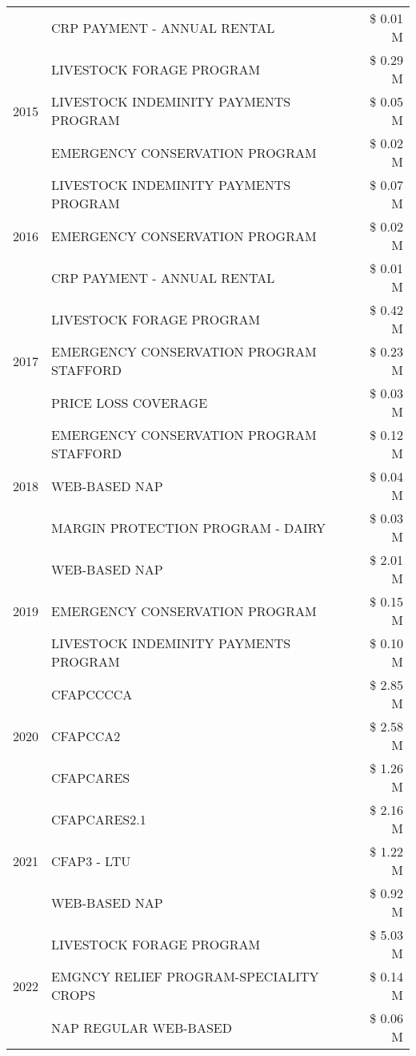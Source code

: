 \begin{tabular}{llr}
 & CRP PAYMENT - ANNUAL RENTAL & \$ 0.01 M \\
\cline{1-3}
\multirow[t]{3}{*}{2015} & LIVESTOCK FORAGE PROGRAM & \$ 0.29 M \\
 & LIVESTOCK INDEMINITY PAYMENTS PROGRAM & \$ 0.05 M \\
 & EMERGENCY CONSERVATION PROGRAM & \$ 0.02 M \\
\cline{1-3}
\multirow[t]{3}{*}{2016} & LIVESTOCK INDEMINITY PAYMENTS PROGRAM & \$ 0.07 M \\
 & EMERGENCY CONSERVATION PROGRAM & \$ 0.02 M \\
 & CRP PAYMENT - ANNUAL RENTAL & \$ 0.01 M \\
\cline{1-3}
\multirow[t]{3}{*}{2017} & LIVESTOCK FORAGE PROGRAM & \$ 0.42 M \\
 & EMERGENCY CONSERVATION PROGRAM STAFFORD & \$ 0.23 M \\
 & PRICE LOSS COVERAGE & \$ 0.03 M \\
\cline{1-3}
\multirow[t]{3}{*}{2018} & EMERGENCY CONSERVATION PROGRAM STAFFORD & \$ 0.12 M \\
 & WEB-BASED NAP & \$ 0.04 M \\
 & MARGIN PROTECTION PROGRAM - DAIRY & \$ 0.03 M \\
\cline{1-3}
\multirow[t]{3}{*}{2019} & WEB-BASED NAP & \$ 2.01 M \\
 & EMERGENCY CONSERVATION PROGRAM & \$ 0.15 M \\
 & LIVESTOCK INDEMINITY PAYMENTS PROGRAM & \$ 0.10 M \\
\cline{1-3}
\multirow[t]{3}{*}{2020} & CFAPCCCCA & \$ 2.85 M \\
 & CFAPCCA2 & \$ 2.58 M \\
 & CFAPCARES & \$ 1.26 M \\
\cline{1-3}
\multirow[t]{3}{*}{2021} & CFAPCARES2.1 & \$ 2.16 M \\
 & CFAP3 - LTU & \$ 1.22 M \\
 & WEB-BASED NAP & \$ 0.92 M \\
\cline{1-3}
\multirow[t]{3}{*}{2022} & LIVESTOCK FORAGE PROGRAM & \$ 5.03 M \\
 & EMGNCY RELIEF PROGRAM-SPECIALITY CROPS & \$ 0.14 M \\
 & NAP REGULAR WEB-BASED & \$ 0.06 M \\
\cline{1-3}
\bottomrule
\end{tabular}
